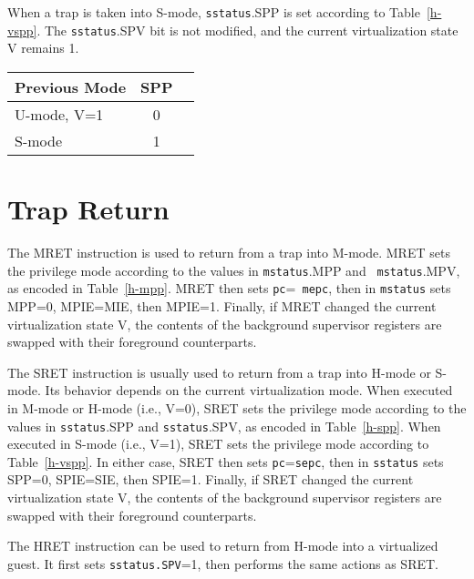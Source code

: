 When a trap is taken into S-mode, {\tt sstatus}.SPP is set according to
Table~\ref{h-vspp}.  The {\tt sstatus}.SPV
bit is not modified, and the current virtualization state V remains 1.

\begin{table*}[h!]
\begin{center}
\begin{tabular}{|l|c|c|}
  \hline
  Previous Mode & SPP \\ \hline
  U-mode, V=1   & 0   \\
  S-mode        & 1   \\ \hline
\end{tabular}
\end{center}
\caption{Value of {\tt sstatus} field SPP after a trap into S-mode.}
\label{h-vspp}
\end{table*}

\section{Trap Return}

The MRET instruction is used to return from a trap into M-mode.  MRET sets the
privilege mode according to the values in {\tt mstatus}.MPP and {\tt
mstatus}.MPV, as encoded in Table~\ref{h-mpp}.  MRET then sets {\tt pc}={\tt
mepc}, then in {\tt mstatus} sets MPP=0, MPIE=MIE, then MPIE=1.  Finally, if
MRET changed the current virtualization state V, the contents of the
background supervisor registers are swapped with their foreground
counterparts.

The SRET instruction is usually used to return from a trap into H-mode or
S-mode.  Its behavior depends on the current virtualization mode.  When
executed in M-mode or H-mode (i.e., V=0), SRET sets the privilege mode
according to the values in {\tt sstatus}.SPP and {\tt sstatus}.SPV, as encoded
in Table~\ref{h-spp}.  When executed in S-mode (i.e., V=1), SRET sets the
privilege mode according to Table~\ref{h-vspp}.  In either case, SRET then
sets {\tt pc}={\tt sepc}, then in {\tt sstatus} sets SPP=0, SPIE=SIE, then
SPIE=1.  Finally, if SRET changed the current virtualization state V, the
contents of the background supervisor registers are swapped with their
foreground counterparts.

The HRET instruction can be used to return from H-mode into a virtualized
guest.  It first sets {\tt sstatus.SPV}=1, then performs the same actions as
SRET.
